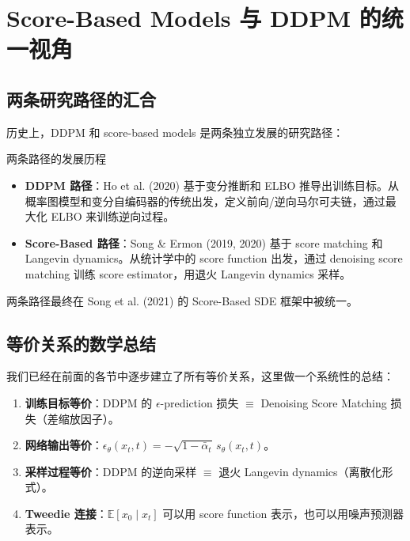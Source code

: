 \section{Score-Based Models 与 DDPM 的统一视角}

\subsection{两条研究路径的汇合}

历史上，DDPM 和 score-based models 是两条独立发展的研究路径：

\begin{knowledgebox}{两条路径的发展历程}
\begin{itemize}
    \item \textbf{DDPM 路径}：Ho et al. (2020) 基于变分推断和 ELBO 推导出训练目标。从概率图模型和变分自编码器的传统出发，定义前向/逆向马尔可夫链，通过最大化 ELBO 来训练逆向过程。
    \item \textbf{Score-Based 路径}：Song \& Ermon (2019, 2020) 基于 score matching 和 Langevin dynamics。从统计学中的 score function 出发，通过 denoising score matching 训练 score estimator，用退火 Langevin dynamics 采样。
\end{itemize}
两条路径最终在 Song et al. (2021) 的 Score-Based SDE 框架中被统一。
\end{knowledgebox}

\subsection{等价关系的数学总结}

我们已经在前面的各节中逐步建立了所有等价关系，这里做一个系统性的总结：

\begin{enumerate}
    \item \textbf{训练目标等价}：DDPM 的 $\epsilon$-prediction 损失 $\equiv$ Denoising Score Matching 损失（差缩放因子）。
    \item \textbf{网络输出等价}：$\epsilon_\theta(x_t, t) = -\sqrt{1-\bar{\alpha}_t}\, s_\theta(x_t, t)$。
    \item \textbf{采样过程等价}：DDPM 的逆向采样 $\equiv$ 退火 Langevin dynamics（离散化形式）。
    \item \textbf{Tweedie 连接}：$\mathbb{E}[x_0 \mid x_t]$ 可以用 score function 表示，也可以用噪声预测器表示。
\end{enumerate}

